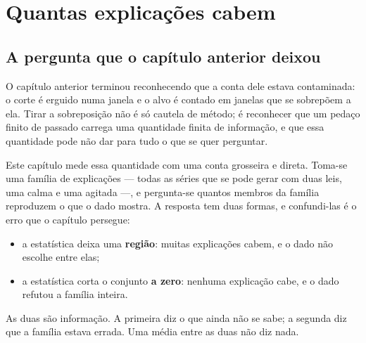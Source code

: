 %
%

\chapter{Quantas explicações cabem}
\label{cap:condicionamento}

\section{A pergunta que o capítulo anterior deixou}

O capítulo anterior terminou reconhecendo que a conta dele estava contaminada: o corte é erguido
numa janela e o alvo é contado em janelas que se sobrepõem a ela. Tirar a sobreposição não é só
cautela de método; é reconhecer que um pedaço finito de passado carrega uma quantidade finita de
informação, e que essa quantidade pode não dar para tudo o que se quer perguntar\cite{masry1996minimum,paninski2003estimation}.

Este capítulo mede essa quantidade com uma conta grosseira e direta. Toma-se uma família de
explicações --- todas as séries que se pode gerar com duas leis, uma calma e uma agitada ---, e
pergunta-se quantos membros da família reproduzem o que o dado mostra. A resposta tem duas
formas, e confundi-las é o erro que o capítulo persegue:

\begin{itemize}[leftmargin=1.5em]
  \item a estatística deixa uma \textbf{região}: muitas explicações cabem, e o dado não escolhe
    entre elas;
  \item a estatística corta o conjunto \textbf{a zero}: nenhuma explicação cabe, e o dado
    refutou a família inteira.
\end{itemize}

As duas são informação. A primeira diz o que ainda não se sabe; a segunda diz que a família
estava errada. Uma média entre as duas não diz nada.

